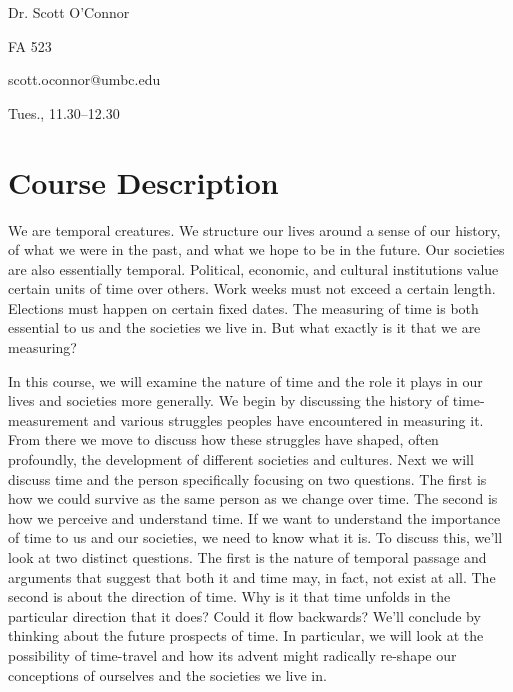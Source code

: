 \documentclass[oneside, 11pt]{article}
\begin{document}
\thispagestyle{fancy}

\begin{multicols}{2}
\begin{description}\addtolength{\itemsep}{-0.5\baselineskip}
\item[Instructor:] Dr. Scott O'Connor 
\item[Office:] FA 523
\columnbreak

\item[Contact:] scott.oconnor@umbc.edu
\item[Office Hours:] Tues., 11.30--12.30
\end{description}
\end{multicols}

\section*{Course Description}
\noindent 
We are temporal creatures. We structure our lives around a sense of our history, of what we were in the past, and what we hope to be in the future. Our societies are also essentially temporal. Political, economic, and cultural institutions value certain units of time over others. Work weeks must not exceed a certain length. Elections must happen on certain fixed dates. The measuring of time is both essential to us and the societies we live in. But what exactly is it that we are measuring?

  In this course, we will examine the nature of time and the role it plays in our lives and societies more generally. We begin by discussing the history of time-measurement and various struggles peoples have encountered in measuring it. From there we move to discuss how these struggles have shaped, often profoundly, the development of different societies and cultures. Next we will  discuss  time and the person specifically focusing on two questions. The first is how we could survive as the same person as we change over time. The second is how we perceive and understand time. If we want to understand the importance of time to us and our societies, we need to know what it is. To discuss this, we'll look at two distinct questions. The first is the nature of temporal passage and arguments that suggest that both it and time may, in fact, not exist at all.  The second is about the direction of time. Why is it that time unfolds in the particular direction that it does? Could it flow backwards? We'll conclude by thinking about the future prospects of time. In particular, we will look at the possibility of time-travel and how its advent might radically re-shape our conceptions of ourselves and the societies we live in. 
\end{document}
